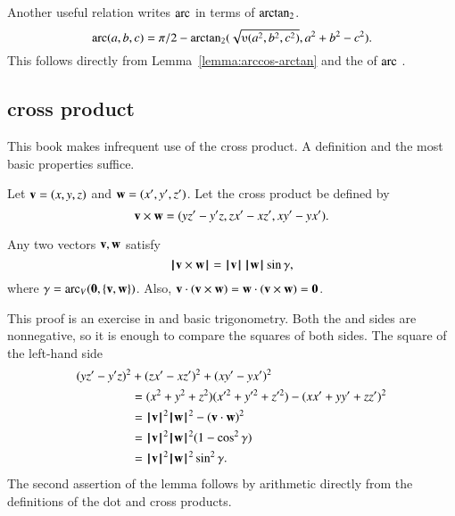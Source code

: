 Another useful relation writes $\operatorname{arc}$ in terms of ${\operatorname{arctan_2}}$.
\begin{equation}\label{eqn:arc-atn}
\arc(a,b,c) = 
\pi/2 - \atn({\sqrt{\ups(a^2,b^2,c^2)}},{ a^2 + b^2 - c^2}).
\end{equation}
This follows directly from Lemma~\ref{lemma:arccos-arctan} and the
 of $\operatorname{arc}$ .



\subsection{cross product} \label{sec:cross}

This book makes infrequent use of the cross product.
A definition and the most basic properties  suffice.

\begin{definition}\label{def:cross}
Let ${\mathbf v} =(x,y,z)$ and ${\mathbf w} = (x',y',z')$.  
Let the cross product be defined
by
\[ 
{\mathbf v} \times {\mathbf w} = (y z' - y' z, z x' - x z', x y' - y x').
\] 
%
%
%
\end{definition}

\begin{lemma}[]  
\label{lemma:los-cross}
Any two vectors ${\mathbf v},{\mathbf w}$ satisfy
\[ {{\hskip0.1em|\hskip-0.15em|\hskip0.1em}{\mathbf v} \times {\mathbf w}{\hskip0.1em|\hskip-0.15em|\hskip0.1em}} =
  {{\hskip0.1em|\hskip-0.15em|\hskip0.1em}{\mathbf v}{\hskip0.1em|\hskip-0.15em|\hskip0.1em}}\,{{\hskip0.1em|\hskip-0.15em|\hskip0.1em}{\mathbf w}{\hskip0.1em|\hskip-0.15em|\hskip0.1em}}\sin\gamma,\] 
where $\gamma=\operatorname{arc}_V({\mathbf 0},\{{\mathbf v},{\mathbf w}\})$.
Also, ${\mathbf v} \cdot ({\mathbf v}\times {\mathbf w}) = {\mathbf w}\cdot ({\mathbf v}\times {\mathbf w}) = {\mathbf 0}$.
\end{lemma}

\begin{proved} This proof is an exercise in
   and basic trigonometry.
  Both the  and
   sides are nonnegative, so it is
  enough to compare the squares of both sides.  The square of the
  left-hand side 
\begin{align*}
  (y z'- y'z)^2 &+ (z x' - x z')^2 + (x y' - y x')^2 \\
  &= %
  (x^2 + y^2 + z^2)(x'^2 + y'^2 + z'^2) - (x x' + y y' + z z')^2
  \\&= %
  \normo{\v}^2\normo{\w}^2 - (\v\cdot \w)^2 \\
  &= %
  \normo{\v}^2\normo{\w}^2 ( 1 - \cos^2\gamma)\\
  &= %
\normo{\v}^2\normo{\w}^2 \sin^2\gamma.
\end{align*}
The second assertion of the lemma follows by arithmetic directly from
the definitions of the dot and cross products.  \swallowed\end{proved}


